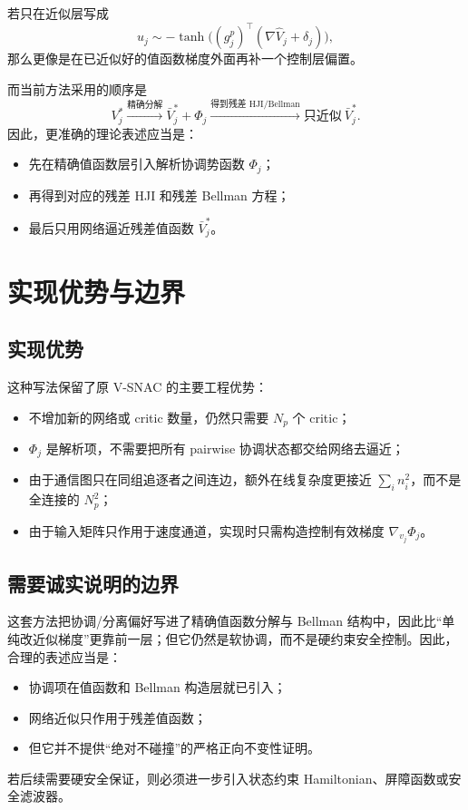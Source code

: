 \documentclass[11pt,a4paper]{article}
\begin{document}
若只在近似层写成
\begin{equation}
u_j \sim -\tanh\!\big((g_j^p)^\top(\nabla \hat V_j+\delta_j)\big),
\end{equation}
那么更像是在已近似好的值函数梯度外面再补一个控制层偏置。

而当前方法采用的顺序是
\begin{equation}
V_j^*
\xrightarrow{\text{精确分解}}
\bar V_j^*+\Phi_j
\xrightarrow{\text{得到残差 HJI/Bellman}}
\text{只近似}\ \bar V_j^*.
\end{equation}
因此，更准确的理论表述应当是：
\begin{itemize}
\item 先在精确值函数层引入解析协调势函数 $\Phi_j$；
\item 再得到对应的残差 HJI 和残差 Bellman 方程；
\item 最后只用网络逼近残差值函数 $\bar V_j^*$。
\end{itemize}

\section{实现优势与边界}

\subsection{实现优势}

这种写法保留了原 V-SNAC 的主要工程优势：
\begin{itemize}
\item 不增加新的网络或 critic 数量，仍然只需要 $N_p$ 个 critic；
\item $\Phi_j$ 是解析项，不需要把所有 pairwise 协调状态都交给网络去逼近；
\item 由于通信图只在同组追逐者之间连边，额外在线复杂度更接近 $\sum_i n_i^2$，而不是全连接的 $N_p^2$；
\item 由于输入矩阵只作用于速度通道，实现时只需构造控制有效梯度 $\nabla_{v_j}\Phi_j$。
\end{itemize}

\subsection{需要诚实说明的边界}

这套方法把协调/分离偏好写进了精确值函数分解与 Bellman 结构中，因此比“单纯改近似梯度”更靠前一层；但它仍然是软协调，而不是硬约束安全控制。因此，合理的表述应当是：
\begin{itemize}
\item 协调项在值函数和 Bellman 构造层就已引入；
\item 网络近似只作用于残差值函数；
\item 但它并不提供“绝对不碰撞”的严格正向不变性证明。
\end{itemize}
若后续需要硬安全保证，则必须进一步引入状态约束 Hamiltonian、屏障函数或安全滤波器。
\end{document}

